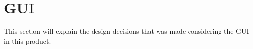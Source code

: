 \section{GUI}
\label{GUI}
This section will explain the design decisions that was made considering the GUI in this product.



